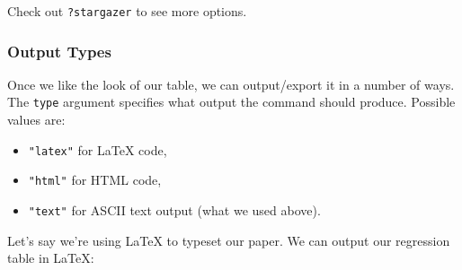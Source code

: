 \documentclass[]{book}
\providecommand{\tightlist}{%
  \setlength{\itemsep}{0pt}\setlength{\parskip}{0pt}}
\begin{document}
Check out \texttt{?stargazer} to see more options.

\subsubsection*{Output Types}\label{output-types}

Once we like the look of our table, we can output/export it in a number
of ways. The \texttt{type} argument specifies what output the command
should produce. Possible values are:

\begin{itemize}
\tightlist
\item
  \texttt{"latex"} for LaTeX code,
\item
  \texttt{"html"} for HTML code,
\item
  \texttt{"text"} for ASCII text output (what we used above).
\end{itemize}

Let's say we're using LaTeX to typeset our paper. We can output our
regression table in LaTeX:
\end{document}
